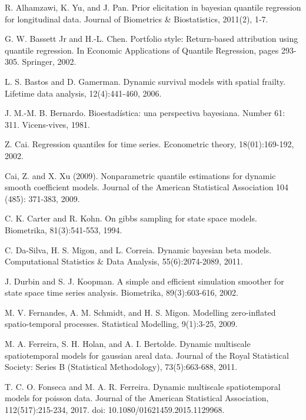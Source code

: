 \documentclass[12pt,a4paper]{article}\usepackage[]{graphicx}\usepackage[]{color}\usepackage{subfigure}
\begin{document}
\begin{thebibliography}{HHH11}
R. Alhamzawi, K. Yu, and J. Pan. Prior elicitation in bayesian quantile regression for longitudinal data. 
Journal of Biometrics \& Biostatistics, 2011(2), 1-7.

G. W. Bassett Jr and H.-L. Chen. Portfolio style: Return-based attribution using quantile regression. 
In Economic Applications of Quantile Regression, pages 293-305. Springer, 2002.

L. S. Bastos and D. Gamerman. Dynamic survival models with spatial frailty. Lifetime data analysis, 12(4):441-460, 2006.

J. M.-M. B. Bernardo. Bioestadística: una perspectiva bayesiana. Number 61: 311. Vicens-vives, 1981.

 Z. Cai. Regression quantiles for time series. Econometric theory, 18(01):169-192, 2002.

 Cai, Z. and X. Xu (2009). Nonparametric quantile estimations for dynamic smooth
coefficient models. Journal of the American Statistical Association 104 (485): 371-383, 2009.

 C. K. Carter and R. Kohn. On gibbs sampling for state space models. Biometrika, 81(3):541-553, 1994.

 C. Da-Silva, H. S. Migon, and L. Correia. Dynamic bayesian beta models. Computational Statistics \& Data Analysis, 
55(6):2074-2089, 2011.

 J. Durbin and S. J. Koopman. A simple and efficient simulation smoother for state space time series analysis. Biometrika, 
89(3):603-616, 2002.

 M. V. Fernandes, A. M. Schmidt, and H. S. Migon. Modelling zero-inflated spatio-temporal processes. Statistical Modelling, 
9(1):3-25, 2009.

M. A. Ferreira, S. H. Holan, and A. I. Bertolde. Dynamic multiscale
spatiotemporal models for gaussian areal data. Journal of the Royal Statistical Society: Series B (Statistical Methodology), 73(5):663-688, 2011.

T. C. O. Fonseca and M. A. R. Ferreira. Dynamic multiscale spatiotemporal
models for poisson data. Journal of the American Statistical Association,
112(517):215-234, 2017. doi: 10.1080/01621459.2015.1129968.


\end{thebibliography}
\end{document}

